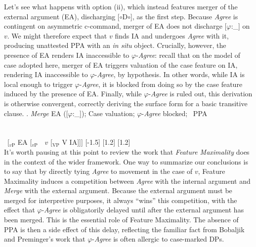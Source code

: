 \documentclass[11pt, letterpaper]{paper_nick}
\newcommand{\fm}[1]{[$\circ$#1$\circ$]}
\begin{document}
Let's see what happens with option (ii), which instead features merger of the external argument (EA), discharging \fm{D}, as the first step. Because \emph{Agree} is contingent on asymmetric c-command, merger of EA does not discharge [$\varphi$:\_] on $v$. We might therefore expect that $v$ finds IA and undergoes \emph{Agree} with it, producing unattested PPA with an \emph{in situ} object. Crucially, however, the presence of EA renders IA inaccessible to $\varphi$-\emph{Agree}: recall that on the model of case adopted here, merger of EA triggers valuation of the case feature on IA, rendering IA inaccessible to $\varphi$-\emph{Agree}, by hypothesis. In other words, while IA is local enough to trigger $\varphi$-\emph{Agree}, it is blocked from doing so by the case feature induced by the presence of EA. Finally, while $\varphi$-\emph{Agree} is ruled out, this derivation is otherwise convergent, correctly deriving the surface form for a basic transitive clause.  
\ex. \emph{Merge} EA ([$\varphi$:\_]); Case valuation; $\varphi$-\emph{Agree} blocked; \xmark\ PPA \\\\\\
\ [$_\text{$v$P}$ \hspace*{-.3cm}EA [$_\text{$v$P}$\ \ \hspace*{-.2cm}\hspace*{-.2cm}$v$ [$_\text{VP}$ V \hspace*{-.3cm}IA]]]
[-1.5]
[1.2]
[1.2]\\


It's worth pausing at this point to review the work that \emph{Feature Maximality} does in the context of the wider framework. One way to summarize our conclusions is to say that by directly tying \emph{Agree} to movement in the case of $v$, Feature Maximality induces a competition between \emph{Agree} with the internal argument and \emph{Merge} with the external argument. Because the external argument must be merged for interpretive purposes, it always ``wins'' this competition, with the effect that $\varphi$-\emph{Agree} is obligatorily delayed until after the external argument has been merged. This is the essential role of Feature Maximality. The absence of PPA is then a side effect of this delay, reflecting the familiar fact from Bobaljik and Preminger's work that $\varphi$-\emph{Agree} is often allergic to case-marked DPs. 
\end{document}
